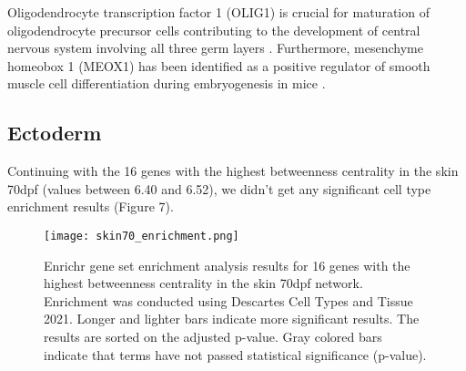 \documentclass[
	a4paper, %
	10pt, %
	unnumberedsections, %
	twoside, %
]{LTJournalArticle}
\begin{document}
\begin{table}[H]
	\caption{Transcription Factor Target Over-representation Analysis results for 10 genes with the highest betweenness centrality in the muscle NB network from the ChEA3 web tool.}
	\label{tab:muscleNB_tf}
	\end{table}

\noindent Oligodendrocyte transcription factor 1 (OLIG1) is crucial for 
maturation of oligodendrocyte precursor cells contributing to the development
of central nervous system involving all three germ layers \autocite{zhao2019a, elshazzly2023a}.
Furthermore, mesenchyme homeobox 1 (MEOX1) has been identified
as a positive regulator of smooth muscle cell differentiation
during embryogenesis in mice \autocite{dong2018a}.

\subsection{\small Ectoderm}
Continuing with the 16 genes with the highest betweenness centrality in the skin 70dpf
(values between 6.40 and 6.52), we didn't get any significant cell type enrichment 
results (Figure 7).

\begin{figure}[H] %
	\texttt{[image: skin70\_enrichment.png]}
	\caption{Enrichr gene set enrichment analysis results for 16 genes
	with the highest betweenness centrality in the skin 70dpf network. Enrichment 
	was conducted using Descartes Cell Types and Tissue 2021. Longer and lighter
	bars indicate more significant results. The results are sorted on
	the adjusted p-value. Gray colored bars indicate that terms have 
	not passed statistical significance (p-value).}
	\label{fig:skin70enr}
\end{figure}
\end{document}
